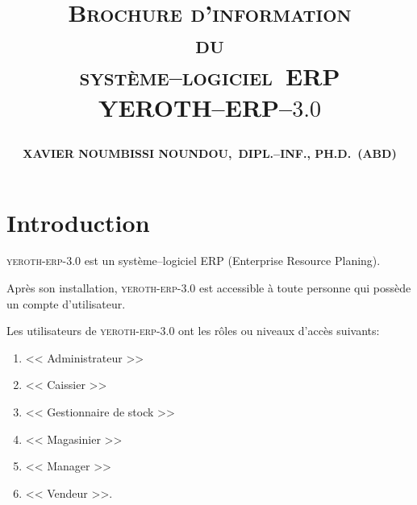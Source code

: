 \documentclass[a4paper, 10pt, twocolumn]{article}
\newcommand{\pos}{syst\`eme--logiciel~ERP\xspace}
\newcommand{\yerenpos}{\textcolor{yerenColorBlue}{\sc YEROTH--ERP--$3.0$}\xspace}
\newcommand{\myfullacademicname}{XAVIER NOUMBISSI NOUNDOU,~DIPL.--INF., PH.D.~(ABD)\xspace}
\newcommand{\yeren}{\textsc{yeroth-erp-3.0}\xspace}
\newcommand{\manager}{<< Manager >>\xspace}
\newcommand{\caissier}{<< Caissier >>\xspace}
\newcommand{\administrateur}{<< Administrateur >>\xspace}
\newcommand{\magasinier}{<< Magasinier >>\xspace}
\newcommand{\vendeur}{<< Vendeur >>\xspace}
\newcommand{\gestionairedestocks}{<< Gestionnaire de stock >>\xspace}
\begin{document}

\title{
\vspace{-1.65em}
\textcolor{medgreen}{\textsc{\textbf{Brochure d'information \\
										du \\
									 \pos \\ \vspace{1em}
									 \yerenpos}}}
									 \author{\textbf{\myfullacademicname}}
}

\date{} 
\maketitle
\thispagestyle{fancy}



\vspace{-1.1em}
\section{Introduction}
\vspace{-0.3em}
\yeren est un syst\`eme--logiciel ERP (Enterprise Resource Planing).

Apr\`es son installation, \yeren est accessible \`a
toute personne qui poss\`ede un compte d'utilisateur.

Les utilisateurs de \yeren ont les r\^oles ou 
niveaux d'acc\`es suivants:
\begin{enumerate}[1)]
	\itemsep -0.6em
	\item \administrateur
	\item \caissier	
	\item \gestionairedestocks
	\item \magasinier	
	\item \manager
	\item \vendeur.
\end{enumerate}
\end{document}
